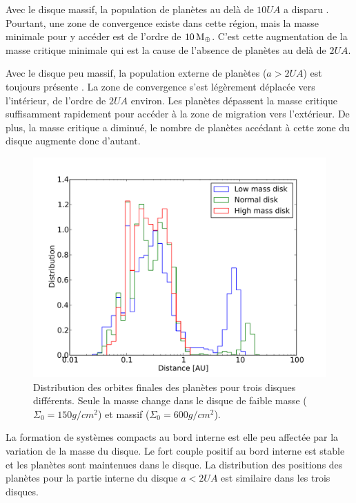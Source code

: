 Avec le disque massif, la population de planètes au delà de $10\unit{UA}$ a disparu . Pourtant, une zone de convergence existe dans cette région, mais la masse minimale pour y accéder est de l'ordre de $10\mathrm{\thinspace M_\oplus}$. C'est cette augmentation de la masse critique minimale qui est la cause de l'absence de planètes au delà de $2\unit{UA}$.

Avec le disque peu massif, la population externe de planètes ($a>2\unit{UA}$) est toujours présente . La zone de convergence s'est légèrement déplacée vers l'intérieur, de l'ordre de $2\unit{UA}$ environ. Les planètes dépassent la masse critique suffisamment rapidement pour accéder à la zone de migration vers l'extérieur. De plus, la masse critique a diminué, le nombre de planètes accédant à cette zone du disque augmente donc d'autant.

\begin{figure}[htbp]
\centering
\includegraphics[width=0.8\linewidth]{figure/HSE/hist_a_disk.pdf}
\caption{Distribution des orbites finales des planètes pour trois disques différents. Seule la masse change dans le disque de faible masse ($\Sigma_0=150\unit{g/cm^2}$) et massif ($\Sigma_0=600\unit{g/cm^2}$).}\label{fig:HSE_hist_a_disk}
\end{figure}

La formation de systèmes compacts au bord interne est elle peu affectée par la variation de la masse du disque. Le fort couple positif au bord interne est stable et les planètes sont maintenues dans le disque. La distribution des positions des planètes pour la partie interne du disque $a<2\unit{UA}$ est similaire dans les trois disques. 

